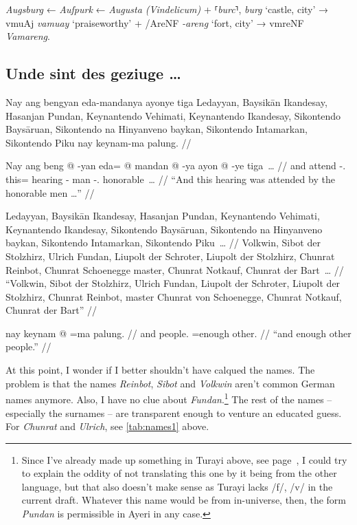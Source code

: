 \documentclass[12pt,paper=a4]{scrartcl}
\newcommand{\fw}[1]{\textit{#1}} %
\newcommand{\norm}[1]{⸢\textit{#1}⸣} %
\newcommand{\ayr}[1]{{\Tagati #1}}
\newcommand{\xayr}[3]{{\Tagati #1} \emph{#2} \enquote*{#3}}
\begin{document}
\Nhg{} \fw{Augsburg} ← \Mhg{} \fw{Auſpurk} ← \Lat{} \fw{Augusta (Vindelicum)} + 
\Mhg{} \norm{burc}, \Ohg{} \fw{burg} `castle, city' → \Ayr{} 
\xayr{vmuAj}{vamuay}{praiseworthy} + \xayr{/AreNF}{-areng}{fort, city} → 
\ayr{vmreNF} \fw{Vamareng}.

\subsection*{Unde sint des geziuge …}


\pex 
	\glpreamble Nay ang bengyan eda-mandanya ayonye tiga Ledayyan, Baysikān 
		Ikandesay, Hasanjan Pundan, Keynantendo Vehimati, Keynantendo 
		Ikandesay, Sikontendo Baysāruan, Sikontendo na Hinyanveno 
		baykan, Sikontendo Intamarkan, Sikontendo Piku nay keynam-ma 
		palung. //
	
	\a \begingl
		\gla Nay ang beng @ -yan eda= @ mandan @ -ya ayon @ -ye tiga~… //
		\glb and \AgtT{} attend -\Tpl{}.\M{} this= hearing -\Loc{} man 
			-\Pl{}.\Top{} honorable~… //
		\glft \enquote{And this hearing was attended by the honorable men 
			…} //
	\endgl
	
	\a \begingl
		\gla Ledayyan, Baysikān Ikandesay, Hasanjan Pundan, Keynantendo 
			Vehimati, Keynantendo Ikandesay, Sikontendo Baysāruan, 
			Sikontendo na Hinyanveno baykan, Sikontendo Intamarkan, 
			Sikontendo Piku~… //
		\glb Volkwin, Sibot {der Stolzhirz}, Ulrich Fundan, Liupolt 
			{der Schroter}, Liupolt {der Stolzhirz}, Chunrat 
			Reinbot, Chunrat \Gen{} Schoenegge master, Chunrat 
			Notkauf, Chunrat {der Bart}~… //
		\glft \enquote{Volkwin, Sibot der Stolzhirz, Ulrich Fundan, 
			Liupolt der Schroter, Liupolt der Stolzhirz, Chunrat 
			Reinbot, master Chunrat von Schoenegge, Chunrat Notkauf, 
			Chunrat der Bart} //
	\endgl
	
	\a \begingl
		\gla nay keynam @ =ma palung. //
		\glb and people.\Top{} =enough other. //
		\glft \enquote{and enough other people.} //
	\endgl
\xe

At this point, I wonder if I better shouldn't have calqued the names. The 
problem is that the names \fw{Reinbot}, \fw{Sibot} and \fw{Volkwin} aren't 
common German names anymore. Also, I have no clue about 
\fw{Fundan}.\footnote{Since I've already made up something in Turayi above, 
see page~\pageref{ex:innomine}, I could try to explain the oddity of not 
translating this one by it being from the other language, but that also doesn't 
make sense as Turayi lacks /f/, /v/ in the current draft. Whatever this name 
would be from in-universe, then, the form \fw{Pundan} is permissible in Ayeri 
in any case.} The rest of the names -- especially the surnames -- are 
transparent enough to venture an educated guess. For \fw{Chunrat} and 
\fw{Ulrich}, see \autoref{tab:names1} above.
\end{document}
